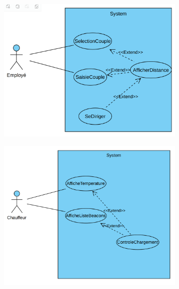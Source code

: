 \documentclass[10pt,a4paper]{book}
\begin{document}
\begin{figure}[h!]
    \centering
    \begin{subfigure}[b]{0.45\textwidth}
        \centering
        \includegraphics[scale=0.14]{Images/recherche-actif.png}
        \caption{}
        \label{recherche-actif.png1}
    \end{subfigure}
    \begin{subfigure}[b]{0.45\textwidth}
        \includegraphics[scale=0.14]{Images/controle-chargement.png}
        \caption{}
        \label{controle-chargement.png1}
    \end{subfigure}
    \caption{}
\end{figure}
\end{document}
